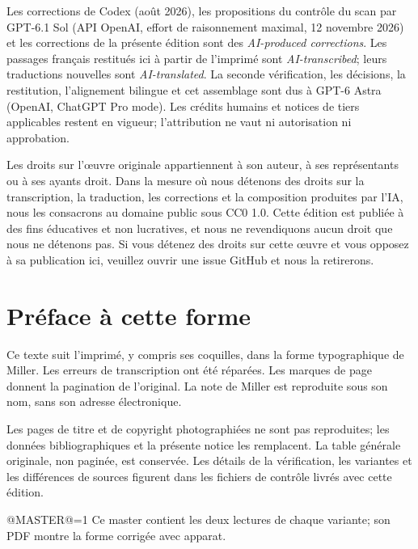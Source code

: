 \documentclass[oneside]{book}
\makeatletter
\theoremstyle{sga-source}
\theoremstyle{sga-source-dash}
\theoremstyle{sga-source-dotdash}
\theoremstyle{sga-source-number-note-dash}
\theoremstyle{sga-source-note-number-dotdash}
\theoremstyle{sga-source-example-dotdash}
\theoremstyle{sga-source-inline-number}
\theoremstyle{sga-source-bare-number}
\theoremstyle{sga-source}
\providecommand\EditionIsMaster{@MASTER@}
\makeatother
\begin{document}
\medskip
Les corrections de Codex (août 2026), les propositions du contrôle du scan
par GPT-6.1 Sol (API OpenAI, effort de raisonnement maximal, 12 novembre
2026) et les corrections de la présente édition sont des
\emph{AI-produced corrections}. Les passages français restitués ici à
partir de l’imprimé sont \emph{AI-transcribed}; leurs traductions nouvelles
sont \emph{AI-translated}. La seconde vérification, les décisions, la
restitution, l’alignement bilingue et cet assemblage sont dus à GPT-6 Astra
(OpenAI, ChatGPT Pro mode). Les crédits humains et notices de tiers
applicables restent en vigueur; l’attribution ne vaut ni autorisation ni
approbation.

\medskip
Les droits sur l'œuvre originale appartiennent à son auteur, à ses représentants ou à ses ayants
droit. Dans la mesure où nous détenons des droits sur la transcription, la traduction, les corrections et la
composition produites par l'IA, nous les consacrons au domaine public sous CC0 1.0. Cette édition est publiée
à des fins éducatives et non lucratives, et nous ne revendiquons aucun droit que nous ne détenons pas. Si vous
détenez des droits sur cette œuvre et vous opposez à sa publication ici, veuillez ouvrir une issue GitHub et
nous la retirerons.

\chapter*{Préface à cette forme}
Ce texte suit l’imprimé, y compris ses coquilles, dans la forme
typographique de Miller. Les erreurs de transcription ont été réparées.
Les marques de page donnent la pagination de l’original. La note de Miller
est reproduite sous son nom, sans son adresse électronique.

Les pages de titre et de copyright photographiées ne sont pas reproduites;
les données bibliographiques et la présente notice les remplacent. La
table générale originale, non paginée, est conservée. Les détails de la
vérification, les variantes et les différences de sources figurent dans
les fichiers de contrôle livrés avec cette édition.

\ifnum\EditionIsMaster=1\relax
Ce master contient les deux lectures de chaque variante; son PDF montre la forme corrigée avec apparat.
\fi

\clearpage

\or
\end{document}
